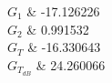 $G_1$	&	-17.126226\\\hline
$G_2$	&	0.991532\\\hline
$G_T$	&	-16.330643\\\hline
$G_{T_{dB}}$	&	24.260066\\\hline
